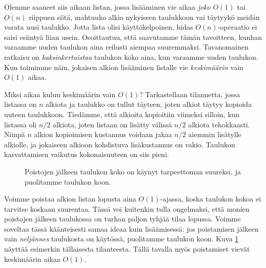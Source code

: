 Olemme saaneet siis aikaan listan, jossa lisääminen
vie aikaa \emph{joko} $O(1)$ tai $O(n)$ riippuen siitä,
mahtuuko alkio nykyiseen taulukkoon vai täytyykö
meidän varata uusi taulukko.
Jotta lista olisi käyttökelpoinen, hidas $O(n)$-operaatio
ei saisi esiintyä liian usein.
Osoittautuu, että saavutamme tämän tavoitteen,
kunhan varaamme uuden taulukon aina reilusti aiempaa suuremmaksi.
Tavanomainen ratkaisu on \emph{kaksinkertaistaa} taulukon koko aina,
kun varaamme uuden taulukon.
Kun toimimme näin, jokaisen alkion lisääminen listalle vie
\emph{keskimäärin} vain $O(1)$ aikaa.

Miksi aikaa kuluu keskimäärin vain $O(1)$?
Tarkastellaan tilannetta, jossa listassa on $n$ alkiota
ja taulukko on tullut täyteen,
joten alkiot täytyy kopioida uuteen taulukkoon.
Tiedämme, että alkioita kopioitiin viimeksi silloin,
kun listassa oli $n/2$ alkiota,
joten listaan on lisätty välissä $n/2$ alkiota tehokkaasti.
Niinpä $n$ alkion kopioimisen kustannus voidaan jakaa
$n/2$ aiemmin lisätylle alkiolle, ja jokaiseen alkioon
kohdistuva lisäkustannus on vakio.
Taulukon kasvattamisen vaikutus kokonaisuuteen on siis pieni.

\begin{figure}
\center
{}
\caption{Poistojen jälkeen taulukon koko on käynyt tarpeettoman suureksi,
ja puolitamme taulukon koon.}                                                                        
\label{fig:lispoi}
\end{figure}

Voimme poistaa alkion listan lopusta aina $O(1)$-ajassa,
koska taulukon kokoa ei tarvitse koskaan suurentaa.
Tässä voi kuitenkin tulla ongelmaksi, että monien poistojen
jälkeen taulukossa on turhan paljon tyhjää tilaa lopussa.
Voimme soveltaa tässä käänteisesti samaa ideaa kuin lisäämisessä:
jos poistamisen jälkeen vain \emph{neljännes} taulukosta on käytössä,
puolitamme taulukon koon.
Kuva \ref{fig:lispoi} näyttää esimerkin tällaisesta tilanteesta.
Tällä tavalla myös poistamiset vievät keskimäärin aikaa $O(1)$.

